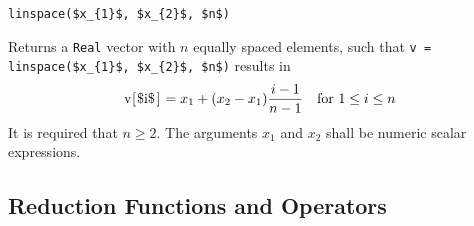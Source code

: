 \begin{operatordefinition}[linspace]
\begin{synopsis}\begin{lstlisting}
linspace($x_{1}$, $x_{2}$, $n$)
\end{lstlisting}\end{synopsis}
\begin{semantics}
Returns a \lstinline!Real! vector with $n$ equally spaced elements, such that \lstinline!v = linspace($x_{1}$, $x_{2}$, $n$)! results in
\begin{equation*}
\text{\lstinline!v[$i$]!} = x_{1} + (x_{2} - x_{1}) \frac{i - 1}{n - 1} \quad \text{for $1 \leq i \leq n$}
\end{equation*}
It is required that $n \geq 2$.  The arguments $x_{1}$ and $x_{2}$ shall be numeric scalar expressions.
\end{semantics}
\end{operatordefinition}

\subsection{Reduction Functions and Operators}\label{reduction-functions-and-operators}

